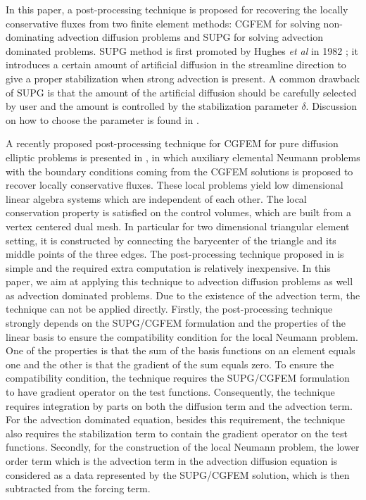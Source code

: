 \documentclass[times]{nlaauth}
\numberwithin{equation}{section}
\begin{document}
In this paper, a post-processing technique is proposed for recovering the locally conservative fluxes from two finite element methods: CGFEM for solving non-dominating advection diffusion problems and SUPG for solving advection dominated problems. SUPG method is first promoted by Hughes {\it et al} in 1982 \cite{brooks1982streamline}; it introduces a certain amount of artificial diffusion in the streamline direction to give a proper stabilization when strong advection is present.  A common drawback of SUPG is that the amount of the artificial diffusion should be carefully selected by user and the amount is controlled by the stabilization parameter $\delta.$ Discussion on how to choose the parameter is found in \cite{brooks1982streamline, tezduyar2000finite, tezduyar2003stabilization}. 

A recently proposed post-processing technique for CGFEM for pure diffusion elliptic problems is presented in \cite{bush2013application}, in which auxiliary elemental Neumann problems with the boundary conditions coming from the CGFEM solutions is proposed to recover locally conservative fluxes. These local problems yield low dimensional linear algebra systems which are independent of each other.  The local conservation property is satisfied on the control volumes, which are built from a vertex centered dual mesh. In particular for two dimensional triangular element setting, it is constructed by connecting the barycenter of the triangle and its middle points of the three edges. The post-processing technique proposed in \cite{bush2013application} is simple and the required extra computation is relatively inexpensive. 
In this paper, we aim at applying this technique to advection diffusion problems as well as advection dominated problems. Due to the existence of the advection term, the technique can not be applied directly. Firstly, the post-processing technique strongly depends on the SUPG/CGFEM formulation and the properties of the linear basis to ensure the compatibility condition for the local Neumann problem. One of the properties is that the sum of the basis functions on an element equals one and the other is that the gradient of the sum equals zero. To ensure the compatibility condition, the technique requires the SUPG/CGFEM formulation to have gradient operator on the test functions. Consequently, the technique requires integration by parts on both the diffusion term and the advection term. For the advection dominated equation, besides this requirement, the technique also requires the stabilization term to contain the gradient operator on the test functions. Secondly, for the construction of the local Neumann problem, the lower order term which is the advection term in the advection diffusion equation is considered as a data represented by the SUPG/CGFEM solution, which is then subtracted from the forcing term.
 
\end{document}
